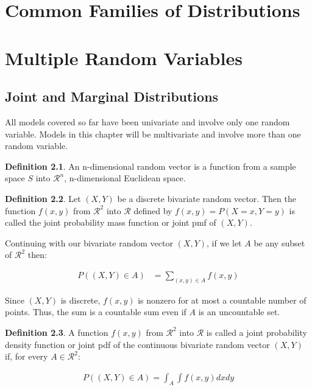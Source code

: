 \documentclass[11pt,a4paper]{report}
\theoremstyle{definition}
\newtheorem{defn}{Definition}[section]
\theoremstyle{theorem}
\theoremstyle{example}
\begin{document}
\chapter{Common Families of Distributions}

\chapter{Multiple Random Variables}

\section{Joint and Marginal Distributions}

All models covered so far have been univariate and involve only one random variable.  Models in this chapter will be multivariate and involve more than one random variable.

\begin{defn}
An n-dimensional random vector is a function from a sample space $S$ into $\mathcal{R}^n$, n-dimensional Euclidean space.  
\end{defn}

\begin{defn}
Let $(X,Y)$ be a discrete bivariate random vector.  Then the function $f(x,y)$ from $\mathcal{R}^2$ into $\mathcal{R}$ defined by $f(x,y) = P(X = x, Y = y)$ is called the joint probability mass function or joint pmf of $(X,Y)$.
\end{defn}

Continuing with our bivariate random vector $(X,Y)$, if we let $A$ be any subset of $\mathcal{R}^2$ then:

\begin{align*}
  P((X,Y) \in A) &= \sum_{(x,y) \in A} f(x,y)
\end{align*}

Since $(X,Y)$ is discrete, $f(x,y)$ is nonzero for at most a countable  number of points.  Thus, the sum is a countable sum even if $A$ is an uncountable set.

\begin{defn}
  A function $f(x,y)$ from $\mathcal{R}^2$ into $\mathcal{R}$ is called a joint probability density function or joint pdf of the continuous bivariate random vector $(X,Y)$ if, for every $A \in \mathcal{R}^2$:

  \begin{align*}
    P((X,Y) \in A) = \int_A \int f(x,y) dx dy
  \end{align*}
\end{defn}
\end{document}

